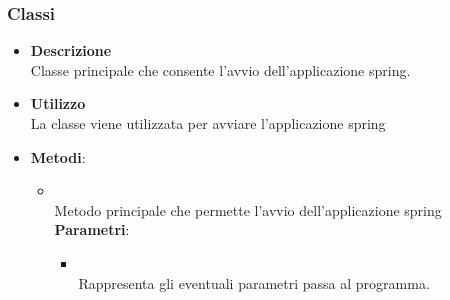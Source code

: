 \subsubsection{Classi}
\label{\nogloxy{swedesigner::server::Application}}
\begin{figure}[h]
\centering
{}
\caption{}
\end{figure}
\FloatBarrier
\begin{itemize}
\item \textbf{Descrizione}\\
Classe principale che consente l'avvio dell'applicazione spring.
\item \textbf{Utilizzo}\\
La classe viene utilizzata per avviare l'applicazione spring
\item \textbf{Metodi}:
\begin{itemize}
\item {}
\\ Metodo principale che permette l'avvio dell'applicazione spring
\textbf{Parametri}:
\begin{itemize}
\item {}
\\ Rappresenta gli eventuali parametri passa al programma.
\end{itemize}
\end{itemize}
\end{itemize}
\subsection{}
\label{\nogloxy{swedesigner::server::compiler}}
